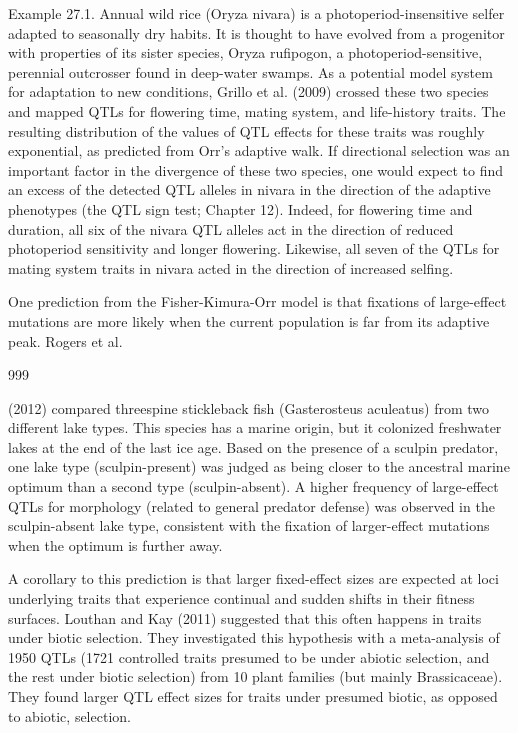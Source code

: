 \documentclass{article}
\begin{document}
Example 27.1. Annual wild rice (Oryza nivara) is a photoperiod-insensitive selfer adapted to seasonally dry habits. It is thought to have evolved from a progenitor with properties of its sister species, Oryza rufipogon, a photoperiod-sensitive, perennial outcrosser found in deep-water swamps. As a potential model system for adaptation to new conditions, Grillo et al. (2009) crossed these two species and mapped QTLs for flowering time, mating system, and life-history traits. The resulting distribution of the values of QTL effects for these traits was roughly exponential, as predicted from Orr's adaptive walk. If directional selection was an important factor in the divergence of these two species, one would expect to find an excess of the detected QTL alleles in nivara in the direction of the adaptive phenotypes (the QTL sign test; Chapter 12). Indeed, for flowering time and duration, all six of the nivara QTL alleles act in the direction of reduced photoperiod sensitivity and longer flowering. Likewise, all seven of the QTLs for mating system traits in nivara acted in the direction of increased selfing.

One prediction from the Fisher-Kimura-Orr model is that fixations of large-effect mutations are more likely when the current population is far from its adaptive peak. Rogers et al.

999

(2012) compared threespine stickleback fish (Gasterosteus aculeatus) from two different lake types. This species has a marine origin, but it colonized freshwater lakes at the end of the last ice age. Based on the presence of a sculpin predator, one lake type (sculpin-present) was judged as being closer to the ancestral marine optimum than a second type (sculpin-absent). A higher frequency of large-effect QTLs for morphology (related to general predator defense) was observed in the sculpin-absent lake type, consistent with the fixation of larger-effect mutations when the optimum is further away.

A corollary to this prediction is that larger fixed-effect sizes are expected at loci underlying traits that experience continual and sudden shifts in their fitness surfaces. Louthan and Kay (2011) suggested that this often happens in traits under biotic selection. They investigated this hypothesis with a meta-analysis of 1950 QTLs (1721 controlled traits presumed to be under abiotic selection, and the rest under biotic selection) from 10 plant families (but mainly Brassicaceae). They found larger QTL effect sizes for traits under presumed biotic, as opposed to abiotic, selection.
\end{document}
